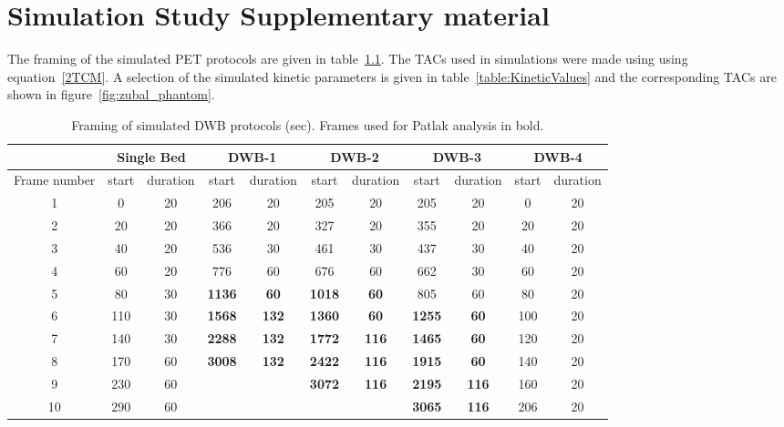 \chapter{Simulation Study Supplementary material}
\label{chap:AppendixB}
The framing of the simulated PET protocols are given in table~\ref{table:FrameTimings}. The TACs used in simulations were made using using equation~\ref{2TCM}.
A selection of the simulated kinetic parameters is given in table~\ref{table:KineticValues} and the corresponding TACs are shown in figure~\ref{fig:zubal_phantom}.

\begin{table}[htb!]
\caption{Framing of simulated DWB protocols (sec). Frames used for Patlak analysis in bold.}
\label{table:FrameTimings}
\begin{tabular}{|c|c|c|c|c|c|c|c|c|c|c|}
\toprule
    \multicolumn{1}{c}{} &\multicolumn{2}{c}{Single Bed} &  \multicolumn{2}{c}{DWB-1} &  \multicolumn{2}{c}{DWB-2} &    \multicolumn{2}{c}{DWB-3} & \multicolumn{2}{c}{DWB-4}   \\
    \midrule
   {Frame number}& start&duration& start&duration & start&duration & start&duration & start&duration \\
\midrule
1  & 0    & 20  & 206  & 20   & 205  & 20   & 205  & 20  & 0    & 20 \\
2  & 20   & 20  & 366  & 20   & 327  & 20   & 355  & 20  & 20   & 20 \\
3  & 40   & 20  & 536  & 30   & 461  & 30   & 437  & 30  & 40   & 20 \\
4  & 60   & 20  & 776  & 60   & 676  & 60   & 662  & 30  & 60   & 20 \\
5  & 80   & 30  & \textbf{1136} & \textbf{60}   & \textbf{1018} & \textbf{60}   & 805 & 60   & 80   & 20 \\
6  & 110  & 30  & \textbf{1568} & \textbf{132}  & \textbf{1360} & \textbf{60}   & \textbf{1255} & \textbf{60}   & 100  & 20 \\
7  & 140  & 30  & \textbf{2288} & \textbf{132}  & \textbf{1772} & \textbf{116}  & \textbf{1465} & \textbf{60}   & 120  & 20 \\
8  & 170  & 60  & \textbf{3008} & \textbf{132}  & \textbf{2422} & \textbf{116}  & \textbf{1915} & \textbf{60}   & 140  & 20 \\
9  & 230  & 60  & & & \textbf{3072} & \textbf{116}  & \textbf{2195} & \textbf{116}  & 160  & 20 \\
10 & 290  & 60  & & & & & \textbf{3065} & \textbf{116} & 206  & 20 \\

\end{tabular}
\end{table}
